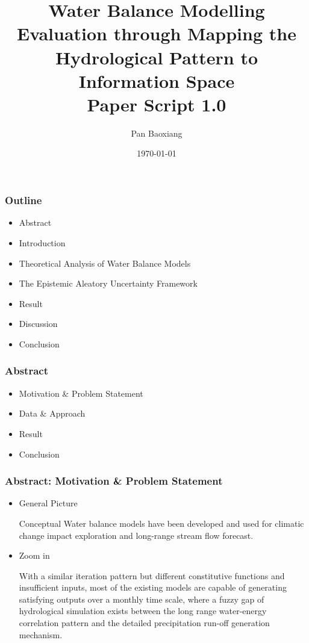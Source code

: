 \documentclass{beamer}
\begin{document}
\title{Water Balance Modelling Evaluation through Mapping the Hydrological Pattern to Information Space\\
\raggedleft Paper Script 1.0}
\date{\today}
\author {Pan Baoxiang}
\maketitle 


\begin{frame}
\frametitle{Outline}
\begin{itemize}
\item Abstract
\item Introduction
\item Theoretical Analysis of Water Balance Models
\item The Epistemic Aleatory Uncertainty Framework
\item Result
\item Discussion
\item Conclusion
\end{itemize}			
\end{frame}

\begin{frame}
\frametitle{Abstract}
\begin{itemize}
\item Motivation \& Problem Statement
\item Data \& Approach
\item Result
\item Conclusion
\end{itemize}
\end{frame}

\begin{frame}
\frametitle{Abstract: Motivation \& Problem Statement}
\begin{itemize}
\item General Picture

Conceptual Water balance models have been developed and used for climatic change impact exploration and long-range stream flow forecast.
\item Zoom in

With a similar iteration pattern but different constitutive functions and insufficient inputs, most of the existing models are capable of generating satisfying outputs over a monthly time scale, where a fuzzy gap of hydrological simulation exists between the long range water-energy correlation pattern and the detailed precipitation run-off generation mechanism. 

\end{itemize}
\end{frame}
\end{document}
